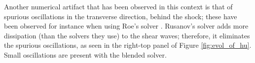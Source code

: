 \documentclass[preprint, 11pt]{article}
\begin{document}
Another numerical artifact that has been observed in this context is that of
spurious oscillations in the transverse direction, behind the shock; these have been
observed for instance when using Roe's solver \cite{navas2019improved}.
Rusanov's solver adds more dissipation (than the solvers they use) to the shear waves; therefore,
it eliminates the spurious oscillations,
as seen in the right-top panel of Figure \ref{fig:evol_of_hu}. Small oscillations are present with the blended solver.
%
 
\begin{figure}[!h]
  \centering
\end{figure}
\end{document}
